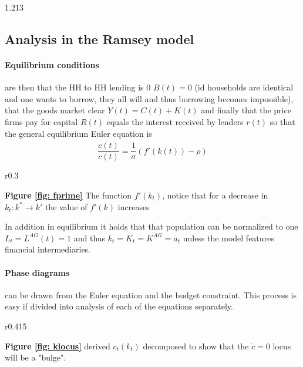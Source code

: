 \documentclass[12pt, a4paper]{article}
\begin{document}
\begin{spacing}{1.213}
\subsection{Analysis in the Ramsey model}
\paragraph{Equilibrium conditions} are then that the HH to HH lending is 0 $B(t) = 0$ (id households are identical and one wants to borrow, they all will and thus borrowing becomes impossible), that the goods market clear $Y(t) = C(t) + \dot{K}(t)$ and finally that the price firms pay for capital $R(t)$ equals the interest received by lenders $r(t)$ so that the general equilibrium Euler equation is
\begin{equation}
\frac{\dot{c(t)}}{c(t)} = \frac{1}{\sigma}(f'(k(t)) - \rho)
\end{equation}

\begin{wrapfigure}[]{r}{0.3\linewidth}
\label{fig: fprime}
\vspace{-15pt}
\def\svgwidth{\linewidth}

 \footnotesize{\textbf{Figure \ref{fig: fprime}} The function $f'(k_t)$, notice that for a decrease in $k_t: k^* \rightarrow k'$ the value of $f'(k)$ increases}
\end{wrapfigure}

In addition in equilibrium it holds that that population can be normalized to one $L_t = L^{AG}(t)=1$ and thus $k_t = K_t = K^{AG}=a_t$ unless the model features financial intermediaries.

\paragraph{Phase diagrams} can be drawn from the Euler equation and the budget constraint. This process is easy if divided into analysis of each of the equations separately.

\begin{wrapfigure}[]{r}{0.415\linewidth}
\label{fig: klocus}
\vspace{-15pt}
\def\svgwidth{\linewidth}

{ \footnotesize{\textbf{Figure \ref{fig: klocus}} derived $c_t(k_t)$ decomposed to show that the $\dot{c}=0$ locus will be a "bulge".}}
\label{fig: kloc}
\end{wrapfigure}


\end{spacing}
\end{document}
